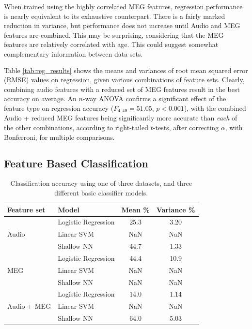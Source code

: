 \documentclass[utf8]{frontiersSCNS} %
\begin{document}
When trained using the highly correlated MEG features, regression performance is nearly equivalent to its exhaustive counterpart. There is a fairly marked reduction in variance, but performance does not increase until Audio and MEG features are combined. This may be surprising, considering that the MEG features are relatively correlated with age. This could suggest somewhat complementary information between data sets. %

Table \ref{tab:reg_results} shows the means and variances of root mean squared error (RMSE) values on regression, given various combinations of feature sets. Clearly, combining audio features with a reduced set of MEG features result in the best accuracy on average. An $n$-way ANOVA confirms a significant effect of the feature type on regression accuracy ($F_{4,49} = 51.05$, $p<0.001$), with the combined Audio + reduced MEG features being significantly more accurate than {\em each} of the other combinations, according to right-tailed $t$-tests, after correcting $\alpha$, with Bonferroni, for multiple comparisons.

\subsection{Feature Based Classification}

\begin{table}[t]
  \centering
  \label{tab:feat_results}
  \begin{tabular}{l l | c | c}
    \textbf{Feature set} & Model & \textbf{Mean \%} & \textbf{Variance \%} \\
    \toprule
    \multirow{3}{*}{Audio}
    & Logistic Regression & 25.3 & 3.20  \\
    & Linear SVM          & NaN & NaN  \\
    & Shallow NN          & 44.7 & 1.33  \\
    \midrule
    \multirow{3}{*}{MEG}
    & Logistic Regression & 44.4 & 10.9  \\
    & Linear SVM          & NaN & NaN  \\
    & Shallow NN          & NaN & NaN  \\
    \midrule
    \multirow{3}{*}{Audio + MEG}
    & Logistic Regression & 14.0 & 1.14  \\
    & Linear SVM          & NaN & NaN  \\
    & Shallow NN          & 64.0 & 5.03  \\
    \bottomrule
  \end{tabular}
  \caption{Classification accuracy using one of three datasets, and three different basic classifier models.}
\end{table}
\end{document}
